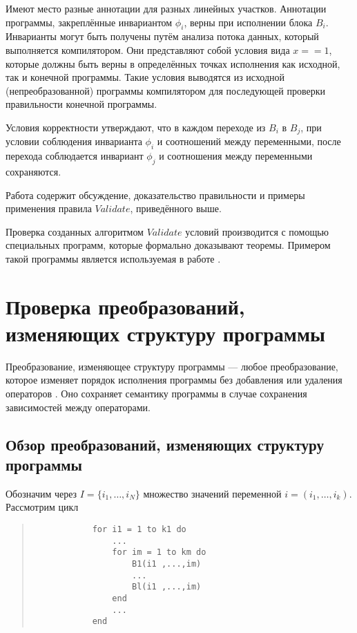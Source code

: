 Имеют место разные аннотации для разных линейных участков. Аннотации программы, закреплённые инвариантом $\phi_{i}$, верны при исполнении блока $B_{i}$. Инварианты могут быть получены путём анализа потока данных, который выполняется компилятором. Они представляют собой условия вида $x == 1$, которые должны быть верны в определённых точках исполнения как исходной, так и конечной программы. Такие условия выводятся из исходной (непреобразованной) программы компилятором для последующей проверки правильности конечной программы.

Условия корректности утверждают, что в каждом переходе из $B_{i}$ в $B_{j}$, при условии соблюдения инварианта $\phi_{i}$ и соотношений между переменными, после перехода соблюдается инвариант $\phi_{j}$ и соотношения между переменными сохраняются.

Работа \cite{ZPFG02} содержит обсуждение, доказательство правильности и примеры применения правила $Validate$, приведённого выше.

Проверка созданных алгоритмом $Validate$ условий производится с помощью специальных программ, которые формально доказывают теоремы. Примером такой программы является используемая в работе \cite{PRSS99}.

\section{Проверка преобразований, изменяющих структуру программы}

Преобразование, изменяющее структуру программы --- любое преобразование, которое изменяет порядок исполнения программы без добавления или удаления операторов \cite{Bacon,AK02}. Оно сохраняет семантику программы в случае сохранения зависимостей между операторами.

\subsection{Обзор преобразований, изменяющих структуру программы}

Обозначим через $I = \{i_1, \ldots, i_N \}$ множество значений переменной $i = (i_1, \ldots, i_k)$. Рассмотрим цикл

\begin{center}
	\begin{quote}
		\begin{verbatim}
            for i1 = 1 to k1 do
                ...
                for im = 1 to km do
                    B1(i1 ,...,im)
                    ...
                    Bl(i1 ,...,im)
                end
                ...
            end
		\end{verbatim}
	\end{quote}
\end{center}

